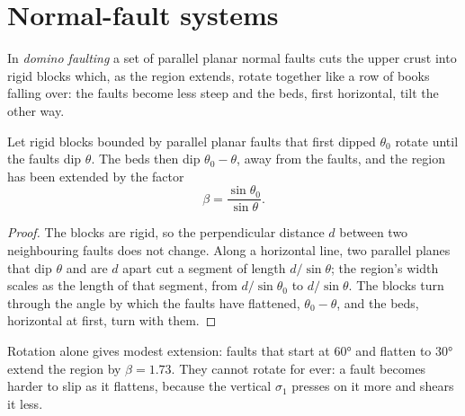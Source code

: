 \begin{omfigure}
\par{}\label{fig:b3:extension-strike-slip:models}
\end{omfigure}

\section{Normal-fault systems}\label{sec:b3:extension-strike-slip:faults}

\begin{definition}\label{def:b3:extension-strike-slip:domino}
In \emph{domino faulting} a set of parallel planar
normal faults cuts the upper crust into rigid blocks which, as the region
extends, rotate together like a row of books falling over: the faults become
less steep and the beds, first horizontal, tilt the other way.
\end{definition}

\begin{theorem}\label{thm:b3:extension-strike-slip:domino}
Let rigid blocks bounded by parallel planar faults that first dipped
$\theta_0$ rotate until the faults dip $\theta$. The beds then dip $\theta_0
- \theta$, away from the faults, and the region has been extended by the
factor
\[
  \beta = \frac{\sin\theta_0}{\sin\theta} .
\]
\end{theorem}

\begin{proof}
The blocks are rigid, so the perpendicular distance $d$ between two
neighbouring faults does not change. Along a horizontal line, two parallel
planes that dip $\theta$ and are $d$ apart cut a segment of length $d/\sin
\theta$; the region's width scales as the length of that segment, from
$d/\sin\theta_0$ to $d/\sin\theta$. The blocks turn through the angle by
which the faults have flattened, $\theta_0 - \theta$, and the beds, horizontal
at first, turn with them.
\end{proof}

Rotation alone gives modest extension: faults that start at \ang{60} and
flatten to \ang{30} extend the region by $\beta = 1.73$. They cannot rotate
for ever: a fault becomes harder to slip as it flattens, because the vertical
$\sigma_1$ presses on it more and shears it less.

